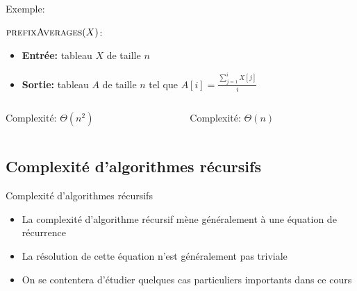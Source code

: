\begin{frame}{Exemple: }

$\textnormal{\scshape prefixAverages}(X)$:
\begin{itemize}
\item {\bf Entrée:} tableau $X$ de taille $n$
\item {\bf Sortie:} tableau $A$ de taille $n$ tel que $A[i]=\frac{\sum_{j=1}^i X[j]}{i}$
\end{itemize}

\begin{columns}
\begin{column}{5cm}
\begin{center}\small
\end{center}
Complexité: $\Theta(n^2)$
\end{column}
\begin{column}{5cm}
\begin{center}\small
\end{center}
Complexité: $\Theta(n)$
\end{column}
\end{columns}
\end{frame}




\subsection{Complexité d'algorithmes récursifs}

\begin{frame}{Complexité d'algorithmes récursifs}

\begin{itemize}
\item La complexité d'algorithme récursif mène généralement à une équation de récurrence
\item La résolution de cette équation n'est généralement pas triviale
\item On se contentera d'étudier quelques cas particuliers importants dans ce cours
\end{itemize}

\end{frame}

